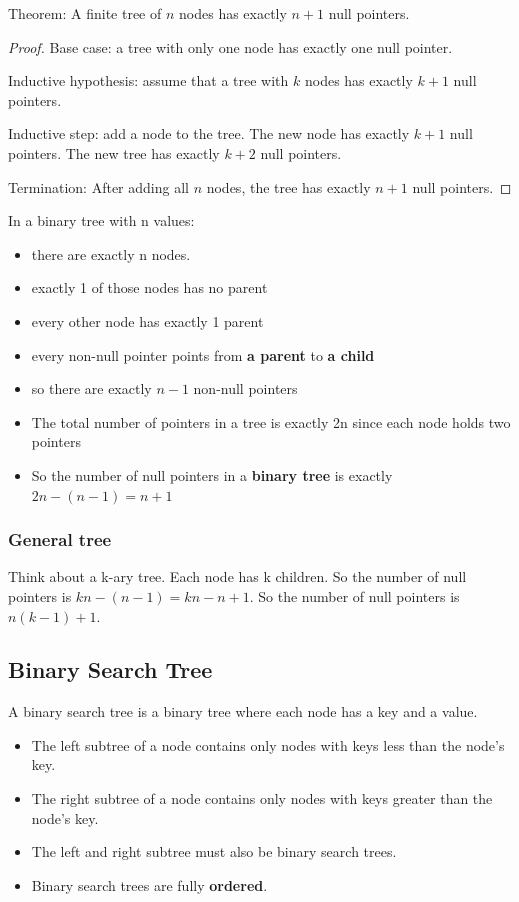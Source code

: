 \documentclass[letterpaper,12pt]{article}
\begin{document}
Theorem: A finite tree of $n$ nodes has exactly $n+1$ null pointers.

\begin{proof}
    Base case: a tree with only one node has exactly one null pointer.

    Inductive hypothesis: assume that a tree with $k$ nodes has exactly $k+1$ null pointers.

    Inductive step: add a node to the tree. The new node has exactly $k+1$ null pointers. The new tree has exactly $k+2$ null pointers.

    Termination: After adding all $n$ nodes, the tree has exactly $n+1$ null pointers.
\end{proof}
In a binary tree with n values:\begin{itemize}
    \item there are exactly n nodes.
    \item exactly 1 of those nodes has no parent
    \item every other node has exactly 1 parent
    \item every non-null pointer points from \textbf{a parent} to \textbf{a child}
    \item so there are exactly $n-1$ non-null pointers
    \item The total number of pointers in a tree is exactly 2n since each node holds two pointers
    \item So the number of null pointers in a \textbf{binary tree} is exactly $2n-(n-1)=n+1$
\end{itemize}

\subsubsection{General tree}
Think about a k-ary tree. Each node has k children. So the number of null pointers is $kn-(n-1)=kn-n+1$. So the number of null pointers is $n(k-1)+1$.
\subsection{Binary Search Tree}
A binary search tree is a binary tree where each node has a key and a value. \begin{itemize}
    \item The left subtree of a node contains only nodes with keys less than the node's key.
    \item The right subtree of a node contains only nodes with keys greater than the node's key.
    \item The left and right subtree must also be binary search trees.
    \item Binary search trees are fully \textbf{ordered}.
\end{itemize}
\end{document}
